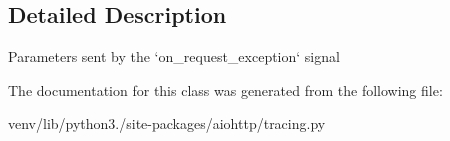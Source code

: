 \subsection{Detailed Description}
\begin{DoxyVerb}Parameters sent by the `on_request_exception` signal\end{DoxyVerb}
 

The documentation for this class was generated from the following file\+:\begin{DoxyCompactItemize}
\item 
venv/lib/python3./site-\/packages/aiohttp/tracing.\+py\end{DoxyCompactItemize}
